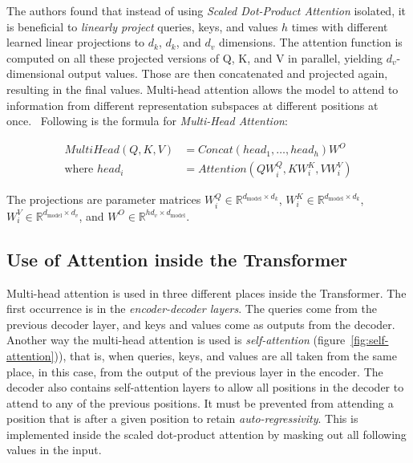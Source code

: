 The authors found that instead of using \textit{Scaled Dot-Product Attention} isolated, it is beneficial to \textit{linearly project} queries, keys, and values $h$ times with different learned linear projections to $d_k$, $d_k$, and $d_v$ dimensions.
The attention function is computed on all these projected versions of Q, K, and V in parallel, yielding $d_v$-dimensional output values.
Those are then concatenated and projected again, resulting in the final values.
Multi-head attention allows the model to attend to information from different representation subspaces at different positions at once.~\cite{attention-is-all-you-need}
Following is the formula for \textit{Multi-Head Attention}:

\begin{align*}
    MultiHead(Q, K, V) &= Concat(head_1, \ldots, head_h) W^O \\
    \text{where }head_i &= Attention(QW^Q_i, KW^K_i, VW^V_i)
\end{align*}

The projections are parameter matrices $W^Q_i \in \mathbb{R}^{d_{\text{model}} \times d_k}$, $W^K_i \in \mathbb{R}^{d_{\text{model}} \times d_k}$, $W^V_i \in \mathbb{R}^{d_{\text{model}} \times d_v}$, and $W^O \in \mathbb{R}^{hd_v \times d_{\text{model}}}$.

\subsection{Use of Attention inside the Transformer}\label{subsec:use-of-attention-inside-the-transformer}

Multi-head attention is used in three different places inside the Transformer.
The first occurrence is in the \textit{encoder-decoder layers}.
The queries come from the previous decoder layer, and keys and values come as outputs from the decoder.
Another way the multi-head attention is used is \textit{self-attention} (figure~\ref{fig:self-attention})), that is, when queries, keys, and values are all taken from the same place, in this case, from the output of the previous layer in the encoder.
The decoder also contains self-attention layers to allow all positions in the decoder to attend to any of the previous positions.
It must be prevented from attending a position that is after a given position to retain \textit{auto-regressivity}.
This is implemented inside the scaled dot-product attention by masking out all following values in the input.~\cite{attention-is-all-you-need}

